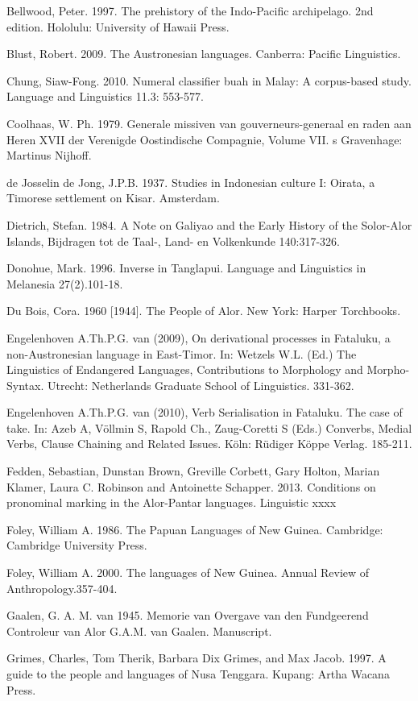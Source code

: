 Bellwood, Peter. 1997. The prehistory of the Indo-Pacific archipelago. 2nd edition. Hololulu: University of Hawaii Press.

Blust, Robert. 2009. The Austronesian languages. Canberra: Pacific Linguistics.

Chung, Siaw-Fong. 2010. Numeral classifier buah in Malay: A corpus-based study. Language and Linguistics 11.3: 553-577. 

Coolhaas, W. Ph. 1979. Generale missiven van gouverneurs-generaal en raden aan Heren XVII der Verenigde Oostindische Compagnie, Volume VII. s Gravenhage: Martinus Nijhoff.

de Josselin de Jong, J.P.B. 1937. Studies in Indonesian culture I: Oirata, a Timorese settlement on Kisar. Amsterdam.

Dietrich, Stefan. 1984. A Note on Galiyao and the Early History of the Solor-Alor Islands, Bijdragen tot de Taal-, Land- en Volkenkunde 140:317-326.

Donohue, Mark. 1996. Inverse in Tanglapui. Language and Linguistics in Melanesia 27(2).101-18.

Du Bois, Cora. 1960 [1944]. The People of Alor. New York: Harper Torchbooks.

Engelenhoven A.Th.P.G. van (2009), On derivational processes in Fataluku, a non-Austronesian language in East-Timor. In: Wetzels W.L. (Ed.) The Linguistics of Endangered Languages, Contributions to Morphology and Morpho-Syntax. Utrecht: Netherlands Graduate School of Linguistics. 331-362.

Engelenhoven A.Th.P.G. van (2010), Verb Serialisation in Fataluku. The case of take. In: Azeb A, V\"ollmin S, Rapold Ch., Zaug-Coretti S (Eds.) Converbs, Medial Verbs, Clause Chaining and Related Issues. K\"oln: R\"udiger K\"oppe Verlag. 185-211.

Fedden, Sebastian, Dunstan Brown, Greville Corbett, Gary Holton, Marian Klamer, Laura C. Robinson and Antoinette Schapper. 2013. Conditions on pronominal marking in the Alor-Pantar languages. Linguistic xxxx

Foley, William A. 1986. The Papuan Languages of New Guinea. Cambridge: Cambridge University Press.

Foley, William A. 2000. The languages of New Guinea. Annual Review of Anthropology.357-404.

Gaalen, G. A. M. van 1945. Memorie van Overgave van den Fundgeerend Controleur van Alor G.A.M. van Gaalen. Manuscript.

Grimes, Charles, Tom Therik, Barbara Dix Grimes, and Max Jacob. 1997. A guide to the people and languages of Nusa Tenggara. Kupang: Artha Wacana Press. 

